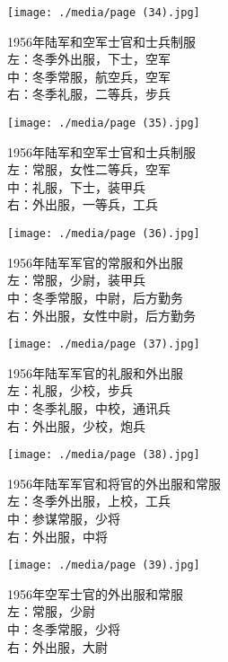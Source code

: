 \begin{figure}
    \texttt{[image: ./media/page (34).jpg]}
    \caption{1956年陆军和空军士官和士兵制服\\左：冬季外出服，下士，空军\\中：冬季常服，航空兵，空军\\右：冬季礼服，二等兵，步兵}
\end{figure}

\begin{figure}
    \texttt{[image: ./media/page (35).jpg]}
    \caption{1956年陆军和空军士官和士兵制服\\左：常服，女性二等兵，空军\\中：礼服，下士，装甲兵\\右：外出服，一等兵，工兵}
\end{figure}

\begin{figure}
    \texttt{[image: ./media/page (36).jpg]}
    \caption{1956年陆军军官的常服和外出服\\左：常服，少尉，装甲兵\\中：冬季常服，中尉，后方勤务\\右：外出服，女性中尉，后方勤务}
\end{figure}

\begin{figure}
    \texttt{[image: ./media/page (37).jpg]}
    \caption{1956年陆军军官的礼服和外出服\\左：礼服，少校，步兵\\中：冬季礼服，中校，通讯兵\\右：外出服，少校，炮兵}
\end{figure}

\begin{figure}
    \texttt{[image: ./media/page (38).jpg]}
    \caption{1956年陆军军官和将官的外出服和常服\\左：冬季外出服，上校，工兵\\中：参谋常服，少将\\右：外出服，中将}
\end{figure}

\begin{figure}
    \texttt{[image: ./media/page (39).jpg]}
    \caption{1956年空军士官的外出服和常服\\左：常服，少尉\\中：冬季常服，少将\\右：外出服，大尉}
\end{figure}

